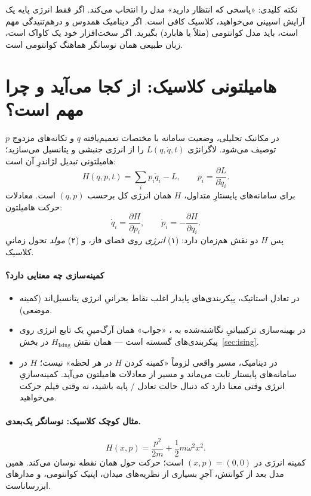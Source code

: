 نکته کلیدی: «پاسخی که انتظار دارید» مدل را انتخاب می‌کند. اگر فقط انرژی پایه یک آرایش اسپینی می‌خواهید،  کلاسیک کافی است. اگر دینامیک همدوس و درهم‌تنیدگی مهم است، باید مدل کوانتومی (مثلاً  یا هابارد) بگیرید. اگر سخت‌افزار خود یک کاواک است، زبان طبیعی همان نوسانگر هماهنگ کوانتومی است.

\section{هامیلتونی کلاسیک: از کجا می‌آید و چرا مهم است؟}
\label{sec:classical-H}

در مکانیک تحلیلی، وضعیت سامانه با مختصات تعمیم‌یافته $q$ و تکانه‌های مزدوج $p$ توصیف می‌شود. لاگرانژی $L(q,\dot q,t)$ را از انرژی جنبشی و پتانسیل می‌سازید؛ هامیلتونی تبدیل لژاندرِ آن است:
\begin{equation}
	\label{eq:classical-H}
	H(q,p,t) = \sum_i p_i\dot q_i - L,
	\qquad
	p_i=\frac{\partial L}{\partial\dot q_i}.
\end{equation}
برای سامانه‌های پایستارِ متداول، $H$ همان انرژی کل برحسب $(q,p)$ است. معادلات حرکت هامیلتون:
\begin{equation}
	\dot q_i = \frac{\partial H}{\partial p_i},
	\qquad
	\dot p_i = -\frac{\partial H}{\partial q_i}.
\end{equation}
پس $H$ دو نقش هم‌زمان دارد: (۱) \emph{انرژی} روی فضای فاز، و (۲) \emph{مولد} تحول زمانیِ کلاسیک.

\paragraph{کمینه‌سازی چه معنایی دارد؟}
\begin{itemize}
	\item در تعادل استاتیک، پیکربندی‌های پایدار اغلب نقاط بحرانیِ انرژی پتانسیل‌اند (کمینه موضعی).
	\item در بهینه‌سازی ترکیبیاتیِ نگاشته‌شده به ، «جواب» همان آرگ‌مینِ یک تابع انرژی روی پیکربندی‌های گسسته است --- همان نقش $H_{\mathrm{Ising}}$ در بخش~\ref{sec:ising}.
	\item در دینامیک، مسیر واقعی لزوماً «کمینه کردن $H$ در هر لحظه» نیست؛ $H$ در سامانه‌های پایستار ثابت می‌ماند و مسیر از معادلات هامیلتون می‌آید. کمینه‌سازیِ انرژی وقتی معنا دارد که دنبال حالت تعادل / پایه باشید، نه وقتی فیلم حرکت می‌خواهید.
\end{itemize}

\paragraph{مثال کوچک کلاسیک: نوسانگر یک‌بعدی.}
\begin{equation}
	H(x,p)=\frac{p^2}{2m}+\frac12 m\omega^2 x^2.
\end{equation}
کمینه انرژی در $(x,p)=(0,0)$ است؛ حرکت حول همان نقطه نوسان می‌کند. همین مدل بعد از کوانتش، آجرِ بسیاری از نظریه‌های میدان، اپتیک کوانتومی، و مدارهای ابررساناست.

